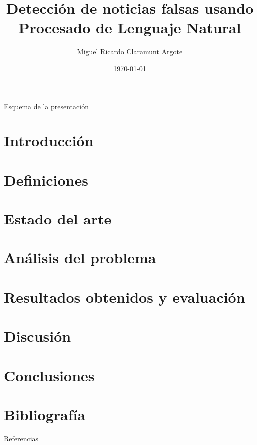 \documentclass{beamer}
\title{Detección de noticias falsas usando Procesado de Lenguaje Natural}
\date{\today}
\author{Miguel Ricardo Claramunt Argote}
\institute{Escola Tècnica Superior d'Enginyeria -- Universitat de València}
\begin{document}
\setwatermark[hoffset=0.02\textwidth,voffset=0.02\textwidth]{}
\begin{frame}
    \titlepage 
\end{frame}

\setwatermark[voffset=0.03\textwidth]{}

\begin{frame}{Esquema de la presentación}
    \tableofcontents
\end{frame}

\section{Introducción}


\section{Definiciones}


\section{Estado del arte}


\section{Análisis del problema}


% 

\section{Resultados obtenidos y evaluación}


\section{Discusión}


\section{Conclusiones}


% 

\section*{Bibliografía}
\begin{frame}{Referencias}
        \printbibliography
\end{frame}
\end{document}
